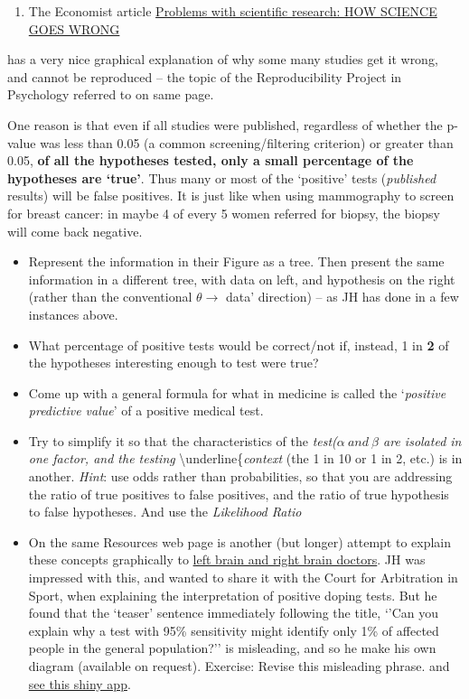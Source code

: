 \documentclass[]{book}
\providecommand{\tightlist}{%
  \setlength{\itemsep}{0pt}\setlength{\parskip}{0pt}}
\begin{document}
\begin{enumerate}
\def\labelenumi{\arabic{enumi}.}
\setcounter{enumi}{10}
\tightlist
\item
  The Economist article \href{http://www.biostat.mcgill.ca/hanley/bios601/CandH-ch0102/HowScienceGoesWrong.pdf}{Problems with scientific research: HOW SCIENCE GOES WRONG}
\end{enumerate}

has a very nice graphical explanation of why some many
studies get it wrong, and cannot be reproduced -- the topic of the Reproducibility Project in Psychology referred to on same page.

One reason is that even if all studies were published, regardless of whether the p-value was less than 0.05 (a common screening/filtering criterion) or greater than 0.05, \textbf{of all the hypotheses tested, only
a small percentage of the hypotheses are `true'}. Thus many or most of the `positive' tests (\emph{published} results) will be false positives. It is just like when using mammography to screen for breast cancer: in maybe 4 of every 5 women referred for biopsy, the biopsy will
come back negative.

\begin{itemize}
\item
  Represent the information in their Figure as
  a tree. Then present the same information in a different tree, with data on left, and hypothesis on the right
  (rather than the conventional \(\theta \rightarrow\) data' direction) -- as JH has done in a few instances above.
\item
  What percentage of positive tests would be correct/not if, instead, 1 in \textbf{2} of the hypotheses interesting enough to test were true?
\item
  Come up with a general formula for what in medicine is called the `\emph{positive predictive value}' of a positive medical test.
\item
  Try to simplify it so that the characteristics of the \emph{test(\(\alpha \ and \ \beta\) are isolated in one factor, and the testing }\textbackslash{}underline\{\emph{context} (the 1 in 10 or 1 in 2, etc.) is in another.
  \emph{Hint}: use odds rather than probabilities, so that you
  are addressing the ratio of true positives to false positives, and the ratio of true hypothesis to false hypotheses. And use the \emph{Likelihood Ratio}
\item
  On the same Resources web page is another (but longer)
  attempt to explain these concepts graphically to \href{http://www.biostat.mcgill.ca/hanley/bios601/CandH-ch0102/RightSideLeftSide.pdf}{left brain and right brain doctors}.
  JH was impressed with this, and wanted to share it with
  the Court for Arbitration in Sport, when explaining the interpretation
  of positive doping tests. But he found that the
  `teaser' sentence immediately following the title, `'Can you explain why a test with 95\% sensitivity might identify only 1\% of affected people in the general population?''
  is misleading, and so he make his own diagram (available on request). Exercise: Revise this misleading phrase.
  and
  \href{http://shinyapps.org/apps/PPV/}{see this shiny app}.
\end{itemize}
\end{document}
